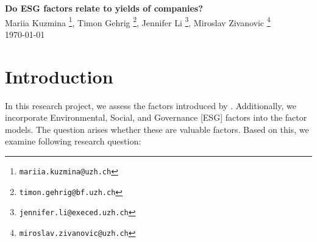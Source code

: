\documentclass[12pt, a4paper]{article}%
\begin{document}
%
%

\begin{titlepage}

\setlength{\topmargin}{0.5cm}

\center

{\Large \bfseries Do ESG factors relate to yields of companies?
}\\[0.5cm] 

Mariia Kuzmina \footnote{\texttt{mariia.kuzmina@uzh.ch}},
Timon Gehrig \footnote{\texttt{timon.gehrig@bf.uzh.ch}},
Jennifer Li \footnote{\texttt{jennifer.li@execed.uzh.ch}},
Miroslav Zivanovic \footnote{\texttt{miroslav.zivanovic@uzh.ch}}\\
\today
\\ [2cm]

\begin{abstract}
    In this project, we employ the Fama and French 3-Factor Model to analyze the relationship between market risk, size, value on monthly returns for Nasdaq 100 constituents. Further, we examine the effects of incorporating an ESG factor into the factor model.
    The results indicate negative betas for market risk and size, suggesting that high returns cannot be solely achieved through systematic risk. Additionally, the inclusion of the ESG factor shows a positive coefficient, suggesting that companies with superior ESG standards may outperform, although statistical significance remains limited.
    Further research with an extended time period and larger sample size may enhance the robustness of these findings.
\end{abstract}

\vspace{3cm}



\vfill 
\end{titlepage}

\tableofcontents


%
%
\newpage
\section{Introduction}
In this research project, we assess the factors introduced by \textcite{FamaFrench1992}. Additionally, we incorporate Environmental, Social, and Governance [ESG] factors into the factor models.
The question arises whether these are valuable factors. Based on this, we examine following research question:\\
\end{document}
